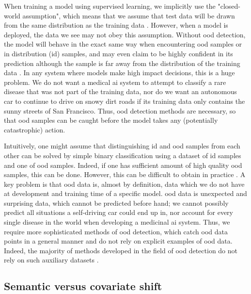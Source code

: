\documentclass[UKenglish]{uiomasterthesis} %
\theoremstyle{definition}
\begin{document}
When training a model using supervised learning, we implicitly use the "closed-world assumption", which means that we assume that test data will be drawn from the same distribution as the training data \cite{oodoverview}. However, when a model is deployed, the data we see may not obey this assumption. Without \ac{ood} detection, the model will behave in the exact same way when encountering \ac{ood} samples or in distribution (\ac{id}) samples, and may even claim to be highly confident in its prediction although the sample is far away from the distribution of the training data \cite[1]{energy}. In any system where models make high impact decisions, this is a huge problem. We do not want a medical \ac{ai} system to attempt to classify a rare disease that was not part of the training data, nor do we want an autonomous car to continue to drive on snowy dirt roads if its training data only contains the sunny streets of San Francisco. Thus, \ac{ood} detection methods are necessary, so that \ac{ood} samples can be caught before the model takes any (potentially catastrophic) action.

Intuitively, one might assume that distinguishing \ac{id} and \ac{ood} samples from each other can be solved by simple binary classification using a dataset of \ac{id} samples and one of \ac{ood} samples. Indeed, if one has sufficient amount of high quality \ac{ood} samples, this can be done. However, this can be difficult to obtain in practice \cite[15]{oodoverview}. A key problem is that \ac{ood} data is, almost by definition, data which we do not have at development and training time of a specific model. \ac{ood} data is unexpected and surprising data, which cannot be predicted before hand; we cannot possibly predict all situations a self-driving car could end up in, nor account for every single disease in the world when developing a medicinal \ac{ai} system. Thus, we require more sophisticated methods of \ac{ood} detection, which catch \ac{ood} data points in a general manner and do not rely on explicit examples of \ac{ood} data. Indeed, the majority of methods developed in the field of \ac{ood} detection do not rely on such auxiliary datasets \cite{openood}. %

\subsection{Semantic versus covariate shift}
\end{document}
